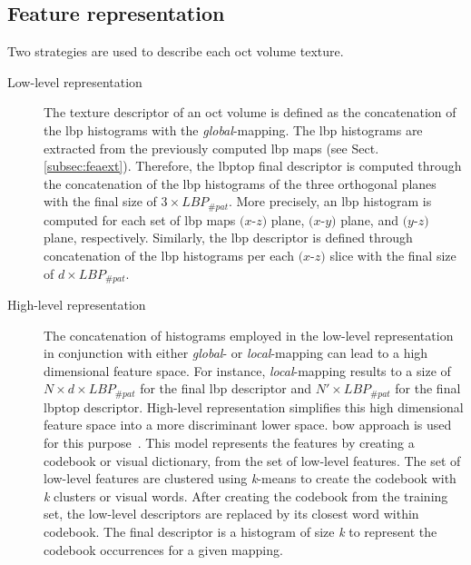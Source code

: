 \subsection{Feature representation}\label{subsec:fearep}


%
Two strategies are used to describe each \ac{oct} volume texture.

\begin{description}

\item[Low-level representation] The texture descriptor of an \ac{oct} volume is defined as the concatenation of the \ac{lbp} histograms with the \emph{global}-mapping.
The \ac{lbp} histograms are extracted from the previously computed \ac{lbp} maps (see Sect.\,\ref{subsec:feaext}).
Therefore, the \ac{lbptop} final descriptor is computed through the concatenation of the \ac{lbp} histograms of the three orthogonal planes with the final size of $3 \times LBP_{\#pat}$.
More precisely, an \ac{lbp} histogram is computed for each set of \ac{lbp} maps $(x$-$z)$ plane, $(x$-$y)$ plane, and $(y$-$z)$ plane, respectively.
Similarly, the \ac{lbp} descriptor is defined through concatenation of the \ac{lbp} histograms per each $(x$-$z)$ slice with the final size of $d \times LBP_{\#pat}$.

\item[High-level representation] The concatenation of histograms employed in the low-level representation in conjunction with either \emph{global}- or \emph{local}-mapping can lead to a high dimensional feature space.
For instance, \emph{local}-mapping results to a size of $N \times d \times LBP_{\#pat}$ for the final \ac{lbp} descriptor and $N' \times LBP_{\#pat}$ for the final \ac{lbptop} descriptor.
High-level representation simplifies this high dimensional feature space into a more discriminant lower space.
\ac{bow} approach is used for this purpose~\cite{Sivic2003}.
This model represents the features by creating a codebook or visual dictionary, from the set of low-level features.
The set of low-level features are clustered using \textit{k}-means to create the codebook with \textit{k} clusters or visual words.
After creating the codebook from the training set, the low-level descriptors are replaced by its closest word within codebook.
The final descriptor is a histogram of size \textit{k} to represent the codebook occurrences for a given mapping.



\end{description}
